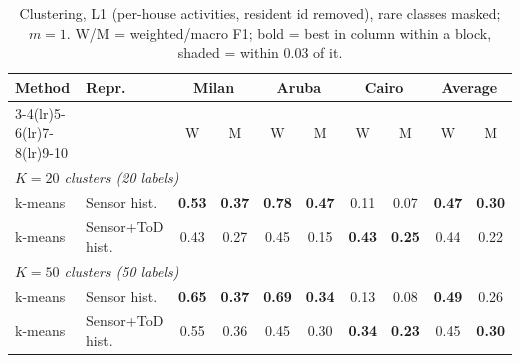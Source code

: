 \begin{table}[H]
\centering\small
\caption{Clustering, L1 (per-house activities, resident id removed), rare classes masked; $m=1$. W/M = weighted/macro F1; bold = best in column within a block, shaded = within 0.03 of it.}
\label{tab:clu_l1_masked_m1}
\setlength{\tabcolsep}{3.5pt}
\begin{tabular}{llcc|cc|cc|cc}
\toprule
Method & Repr. & \multicolumn{2}{c}{Milan} & \multicolumn{2}{c}{Aruba} & \multicolumn{2}{c}{Cairo} & \multicolumn{2}{c}{Average} \\
\cmidrule(lr){3-4}\cmidrule(lr){5-6}\cmidrule(lr){7-8}\cmidrule(lr){9-10}
 & & W & M & W & M & W & M & W & M \\
\midrule
\multicolumn{10}{l}{\textit{$K = 20$ clusters (20 labels)}} \\
\midrule
k-means & Sensor hist. & \cellcolor{blue!12}\textbf{0.53} & \cellcolor{blue!12}\textbf{0.37} & \cellcolor{blue!12}\textbf{0.78} & \cellcolor{blue!12}\textbf{0.47} & 0.11 & 0.07 & \cellcolor{blue!12}\textbf{0.47} & \cellcolor{blue!12}\textbf{0.30} \\
k-means & Sensor+ToD hist. & 0.43 & 0.27 & 0.45 & 0.15 & \cellcolor{blue!12}\textbf{0.43} & \cellcolor{blue!12}\textbf{0.25} & 0.44 & 0.22 \\
\midrule
\multicolumn{10}{l}{\textit{$K = 50$ clusters (50 labels)}} \\
\midrule
k-means & Sensor hist. & \cellcolor{blue!12}\textbf{0.65} & \cellcolor{blue!12}\textbf{0.37} & \cellcolor{blue!12}\textbf{0.69} & \cellcolor{blue!12}\textbf{0.34} & 0.13 & 0.08 & \cellcolor{blue!12}\textbf{0.49} & 0.26 \\
k-means & Sensor+ToD hist. & 0.55 & \cellcolor{blue!12}0.36 & 0.45 & 0.30 & \cellcolor{blue!12}\textbf{0.34} & \cellcolor{blue!12}\textbf{0.23} & 0.45 & \cellcolor{blue!12}\textbf{0.30} \\
\bottomrule
\end{tabular}
\end{table}


